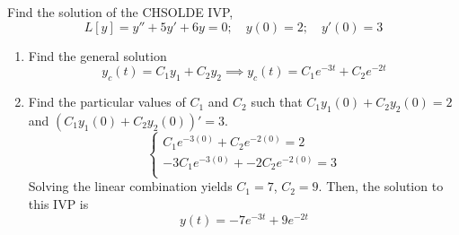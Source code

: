 \documentclass[diffeq.tex]{subfiles}
\begin{document}
\begin{example}
    Find the solution of the CHSOLDE IVP,
    \begin{equation}
        L[y] = y'' + 5y' + 6y = 0;\quad y(0) = 2;\quad y'(0) = 3
    \end{equation}
    \begin{enumerate}
        \item Find the general solution
        \begin{equation}
            y_{c}(t) = C_{1}y_{1} + C_{2}y_{2} \implies y_{c}(t) = C_{1}e^{-3t} + C_{2}e^{-2t}
        \end{equation}
        \item Find the particular values of $C_1$ and $C_2$ such that $C_{1}y_{1}(0) + C_{2}y_{2}(0) = 2$ and $(C_{1}y_{1}(0) + C_{2}y_{2}(0))' = 3$.
        \begin{equation}
            \begin{cases}
                C_{1}e^{-3(0)} + C_{2}e^{-2(0)} = 2\\
                -3C_{1}e^{-3(0)} + -2C_{2}e^{-2(0)} = 3\\
            \end{cases}
        \end{equation}
        Solving the linear combination yields $C_{1} = 7$, $C_{2} = 9$.
        Then, the solution to this IVP is
        \begin{equation}
            y(t) = -7e^{-3t} + 9 e^{-2t}
        \end{equation}
    \end{enumerate}
\end{example}
\end{document}
